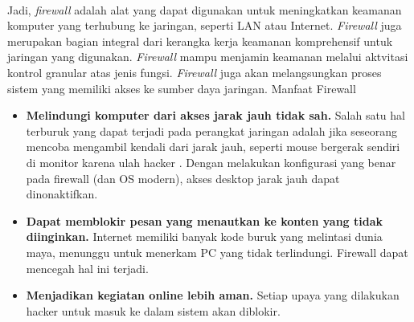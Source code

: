 \documentclass[a4paper,12pt]{article}
\begin{document}
\paragraph{}
Jadi, \textit{firewall} adalah alat yang dapat digunakan untuk meningkatkan keamanan
komputer yang terhubung ke jaringan, seperti LAN atau Internet. \textit{Firewall} juga merupakan
bagian integral dari kerangka kerja keamanan komprehensif untuk jaringan yang
digunakan. \textit{Firewall} mampu menjamin keamanan melalui aktvitasi kontrol granular atas
jenis fungsi. \textit{Firewall} juga akan melangsungkan proses sistem yang memiliki akses ke
sumber daya jaringan.
Manfaat Firewall\\
\begin{itemize}
    \item \textbf{Melindungi komputer dari akses jarak jauh tidak sah.} Salah satu hal terburuk
    yang dapat terjadi pada perangkat jaringan adalah jika seseorang mencoba
    mengambil kendali dari jarak jauh, seperti mouse bergerak sendiri di monitor karena
    ulah hacker . Dengan melakukan konfigurasi yang benar pada firewall (dan OS
    modern), akses desktop jarak jauh dapat dinonaktifkan.
    \item \textbf{Dapat memblokir pesan yang menautkan ke konten yang tidak diinginkan.}
    Internet memiliki banyak kode buruk yang melintasi dunia maya, menunggu untuk
    menerkam PC yang tidak terlindungi. Firewall dapat mencegah hal ini terjadi.
    \item \textbf{Menjadikan kegiatan online lebih aman.} Setiap upaya yang dilakukan hacker
    untuk masuk ke dalam sistem akan diblokir.
\end{itemize}
\end{document}
